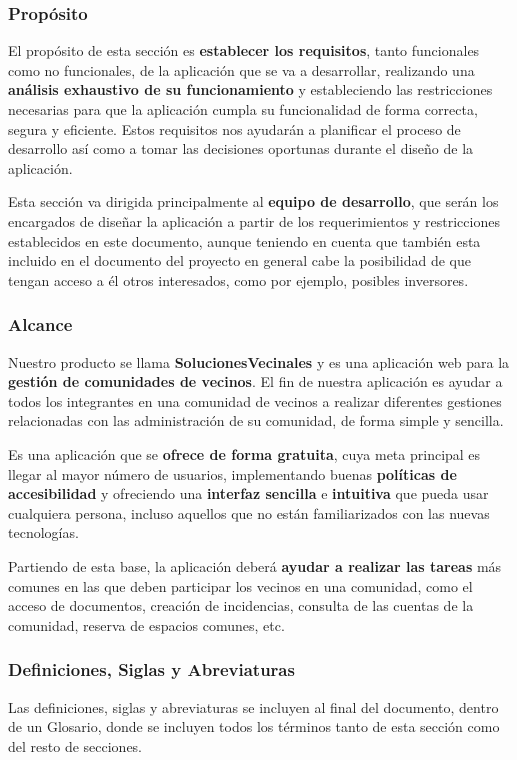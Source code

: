 \subsubsection{Propósito}
El propósito de esta sección es \textbf{establecer los requisitos}, tanto funcionales como no funcionales, de la aplicación que se va a desarrollar, realizando una \textbf{análisis exhaustivo de su funcionamiento} y estableciendo las restricciones necesarias para que la aplicación cumpla su funcionalidad de forma correcta, segura y eficiente. Estos requisitos nos ayudarán a planificar el proceso de desarrollo así como a tomar las decisiones oportunas durante el diseño de la aplicación.

Esta sección va dirigida principalmente al \textbf{equipo de desarrollo}, que serán los encargados de diseñar la aplicación a partir de los requerimientos y restricciones establecidos en este documento, aunque teniendo en cuenta que también esta incluido en el documento del proyecto en general cabe la posibilidad de que tengan acceso a él otros interesados, como por ejemplo, posibles inversores.

\subsubsection{Alcance}
Nuestro producto se llama \textbf{SolucionesVecinales} y es una aplicación web para la \textbf{gestión de comunidades de vecinos}. El fin de nuestra aplicación es ayudar a todos los integrantes en una comunidad de vecinos a realizar diferentes gestiones relacionadas con las administración de su comunidad, de forma simple y sencilla. 

Es una aplicación que se \textbf{ofrece de forma gratuita}, cuya meta principal es llegar al mayor número de usuarios, implementando buenas \textbf{políticas de accesibilidad} y ofreciendo una \textbf{interfaz sencilla} e \textbf{intuitiva} que pueda usar cualquiera persona, incluso aquellos que no están familiarizados con las nuevas tecnologías. 

Partiendo de esta base, la aplicación deberá \textbf{ayudar a realizar las tareas} más comunes en las que deben participar los vecinos en una comunidad, como el acceso de documentos, creación de incidencias, consulta de las cuentas de la comunidad,  reserva de espacios comunes, etc.

\subsubsection{Definiciones, Siglas y Abreviaturas}
Las definiciones, siglas y abreviaturas se incluyen al final del documento, dentro de un Glosario, donde se incluyen todos los términos tanto de esta sección como del resto de secciones.

